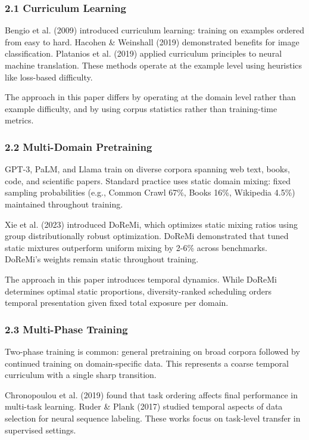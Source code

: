 
\subsubsection{2.1 Curriculum Learning}

Bengio et al. (2009) introduced curriculum learning: training on examples ordered from easy to hard. Hacohen \& Weinshall (2019) demonstrated benefits for image classification. Platanios et al. (2019) applied curriculum principles to neural machine translation. These methods operate at the example level using heuristics like loss-based difficulty.

The approach in this paper differs by operating at the domain level rather than example difficulty, and by using corpus statistics rather than training-time metrics.

\subsubsection{2.2 Multi-Domain Pretraining}

GPT-3, PaLM, and Llama train on diverse corpora spanning web text, books, code, and scientific papers. Standard practice uses static domain mixing: fixed sampling probabilities (e.g., Common Crawl 67\%, Books 16\%, Wikipedia 4.5\%) maintained throughout training.

Xie et al. (2023) introduced DoReMi, which optimizes static mixing ratios using group distributionally robust optimization. DoReMi demonstrated that tuned static mixtures outperform uniform mixing by 2-6\% across benchmarks. DoReMi's weights remain static throughout training.

The approach in this paper introduces temporal dynamics. While DoReMi determines optimal static proportions, diversity-ranked scheduling orders temporal presentation given fixed total exposure per domain.

\subsubsection{2.3 Multi-Phase Training}

Two-phase training is common: general pretraining on broad corpora followed by continued training on domain-specific data. This represents a coarse temporal curriculum with a single sharp transition.

Chronopoulou et al. (2019) found that task ordering affects final performance in multi-task learning. Ruder \& Plank (2017) studied temporal aspects of data selection for neural sequence labeling. These works focus on task-level transfer in supervised settings.


